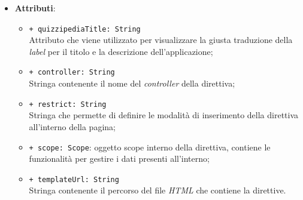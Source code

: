 \begin{itemize}
			\item \textbf{Attributi}:
			\begin{itemize}
		\item \texttt{+ quizzipediaTitle: String} \\ Attributo che viene utilizzato per visualizzare la giusta traduzione della \textit{label} per il titolo e la descrizione dell'applicazione;
		\item \texttt{+ controller: String} \\ Stringa contenente il nome del \textit{controller} della direttiva;
		\item \texttt{+ restrict: String} \\ Stringa che permette di definire le modalità di inserimento della direttiva all'interno della pagina;
		\item \texttt{+ scope: Scope}: oggetto scope interno della direttiva, contiene le funzionalità per gestire i dati presenti all'interno;
		\item \texttt{+ templateUrl: String} \\ Stringa contenente il percorso del file \textit{HTML} che contiene la direttive.
	\end{itemize}
		\end{itemize}